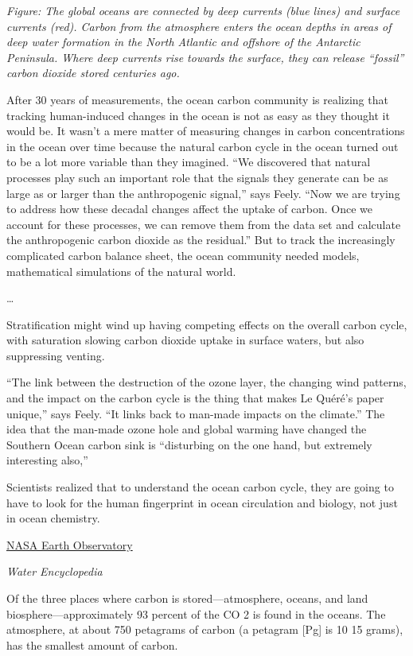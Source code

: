 \documentclass[
]{book}
\begin{document}
\emph{Figure: The global oceans are connected by deep currents (blue lines) and surface currents (red). Carbon from the atmosphere enters the ocean depths in areas of deep water formation in the North Atlantic and offshore of the Antarctic Peninsula. Where deep currents rise towards the surface, they can release ``fossil'' carbon dioxide stored centuries ago.}

After 30 years of measurements, the ocean carbon community is realizing that tracking human-induced changes in the ocean is not as easy as they thought it would be. It wasn't a mere matter of measuring changes in carbon concentrations in the ocean over time because the natural carbon cycle in the ocean turned out to be a lot more variable than they imagined. ``We discovered that natural processes play such an important role that the signals they generate can be as large as or larger than the anthropogenic signal,'' says Feely. ``Now we are trying to address how these decadal changes affect the uptake of carbon. Once we account for these processes, we can remove them from the data set and calculate the anthropogenic carbon dioxide as the residual.'' But to track the increasingly complicated carbon balance sheet, the ocean community needed models, mathematical simulations of the natural world.

\ldots{}

Stratification might wind up having competing effects on the overall carbon cycle, with saturation slowing carbon dioxide uptake in surface waters, but also suppressing venting.

``The link between the destruction of the ozone layer, the changing wind patterns, and the impact on the carbon cycle is the thing that makes Le Quéré's paper unique,'' says Feely. ``It links back to man-made impacts on the climate.'' The idea that the man-made ozone hole and global warming have changed the Southern Ocean carbon sink is ``disturbing on the one hand, but extremely interesting also,''

Scientists realized that to understand the ocean carbon cycle, they are going to have to look for the human fingerprint in ocean circulation and biology, not just in ocean chemistry.

\href{https://earthobservatory.nasa.gov/features/OceanCarbon}{NASA Earth Observatory}

\emph{Water Encyclopedia}

Of the three places where carbon is stored---atmosphere, oceans, and land biosphere---approximately 93 percent of the CO 2 is found in the oceans. The atmosphere, at about 750 petagrams of carbon (a petagram {[}Pg{]} is 10 15 grams), has the smallest amount of carbon.
\end{document}
